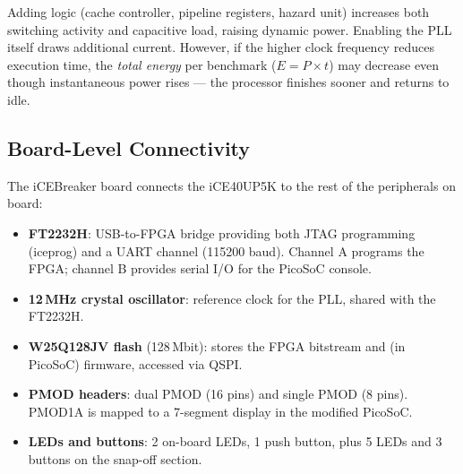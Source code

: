 \documentclass[9pt, a4paper]{extarticle}
\begin{document}
Adding logic (cache controller, pipeline registers, hazard unit) increases both switching activity and capacitive load, raising dynamic power. Enabling the PLL itself draws additional current. However, if the higher clock frequency reduces execution time, the \emph{total energy} per benchmark ($E = P \times t$) may decrease even though instantaneous power rises --- the processor finishes sooner and returns to idle.

\subsection{Board-Level Connectivity}

The iCEBreaker board connects the iCE40UP5K to the rest of the peripherals on board:

\begin{itemize}
    \item \textbf{FT2232H}: USB-to-FPGA bridge providing both JTAG programming (iceprog) and a UART channel (115200 baud). Channel A programs the FPGA; channel B provides serial I/O for the PicoSoC console.
    \item \textbf{12\,MHz crystal oscillator}: reference clock for the PLL, shared with the FT2232H.
    \item \textbf{W25Q128JV flash} (128\,Mbit): stores the FPGA bitstream and (in PicoSoC) firmware, accessed via QSPI.
    \item \textbf{PMOD headers}: dual PMOD (16 pins) and single PMOD (8 pins). PMOD1A is mapped to a 7-segment display in the modified PicoSoC.
    \item \textbf{LEDs and buttons}: 2 on-board LEDs, 1 push button, plus 5 LEDs and 3 buttons on the snap-off section.
\end{itemize}
\end{document}
